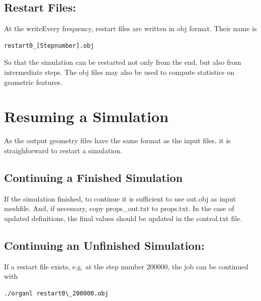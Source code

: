 \documentclass[11pt]{article}
\begin{document}
\subsection{Restart Files: }
At the writeEvery frequency, restart files are written in obj format. Their name is 

\begin{mdframed}[backgroundcolor=lightgray, linecolor=lightgray] 
\begin{verbatim}
restart0_[Stepnumber].obj
\end{verbatim}
\end{mdframed}
So that the simulation can be restarted not only from the end, but also from intermediate steps. The obj files may also be used to compute statistics on geometric features.

\section{Resuming a Simulation}

As the output geometry files have the same format as the input files, it is straighforward to restart a simulation.

\subsection{Continuing a Finished Simulation}
If the simulation finished, to continue it is sufficient to use out.obj as input meshfile. And, if necessary, copy props\_out.txt to props.txt. 
In the case of updated definitions, the final values should be updated in the control.txt file.

\subsection{Continuing an Unfinished Simulation:} 

If a restart file exists, e.g. at the step number 200000, the job can be continued with

\begin{mdframed}[backgroundcolor=lightgray, linecolor=lightgray] 
\begin{verbatim}
./organl restart0\_200000.obj
\end{verbatim}
\end{mdframed}
\end{document}
